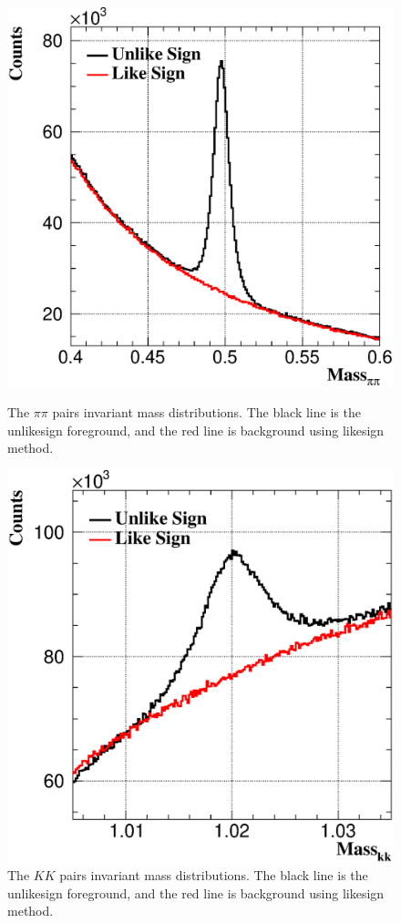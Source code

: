 \begin{figure}[htbp]
\begin{minipage}[htbp]{0.52\linewidth}
\centering
\includegraphics[width=1.0\textwidth]{figure/Run14_D0HFT/massKshort.eps}
\caption{The $\pi\pi$ pairs invariant mass distributions. The black line is the unlikesign foreground, and the red line is background using likesign method. \label{fig:ksmass}}
\end{minipage}
\hfill
\begin{minipage}[htbp]{0.52\linewidth}
\centering
\includegraphics[width=1.0\textwidth]{figure/Run14_D0HFT/massPhi.eps} 
\caption{The $KK$ pairs invariant mass distributions. The black line is the unlikesign foreground, and the red line is background using likesign method. \label{fig:phimass}}
\end{minipage}
\end{figure}

